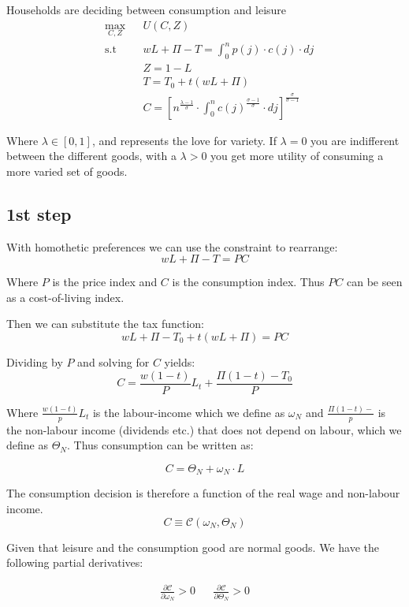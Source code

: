 Households are deciding between consumption and leisure
\begin{equation*}
\begin{aligned}
& \underset{C, Z}{\max}
& & U(C,Z) \\
& \text{s.t}
& & wL + \Pi -T = \int_{0}^{n} p(j) \cdot c(j) \cdot dj \\
& & & Z = 1 - L \\
& & & T = T_0 + t(wL + \Pi) \\
& & & C = \left[ n^{\frac{\lambda - 1}{\sigma}} \cdot \int_{0}^{n} c(j)^{\frac{\sigma - 1}{\sigma}} \cdot dj   \right]^\frac{\sigma}{\sigma - 1}
\end{aligned}
\end{equation*}

Where $\lambda \in \left[0,1 \right]$, and represents the love for variety. If $\lambda = 0$ you are indifferent between the different goods, with a $\lambda > 0$ you get more utility of consuming a more varied set of goods. 

\subsection*{1st step}
With homothetic preferences we can use the constraint to rearrange:
$$
wL + \Pi - T = PC
$$

Where $P$ is the price index and $C$ is the consumption index. Thus $PC$ can be seen as a cost-of-living index. 

Then we can substitute the tax function:
$$
wL + \Pi - T_0 + t(wL + \Pi) = PC
$$

Dividing by $P$ and solving for $C$ yields:
$$
C = \frac{w(1-t)}{P}L_t + \frac{\Pi(1-t)-T_0}{P}
$$

Where $\frac{w(1-t)}{p}L_t$ is the labour-income which we define as $\omega_N$ and $\frac{\Pi(1-t)-}{p}$ is the non-labour income (dividends etc.) that does not depend on labour, which we define as $\Theta_N$. Thus consumption can be written as:

$$
C = \Theta_N + \omega_N \cdot L 
$$


The consumption decision is therefore a function of the real wage and non-labour income. 
$$
C \equiv \mathcal{C}\left(\omega_N, \Theta_N \right)
$$

Given that leisure and the consumption good are normal goods. We have the following partial derivatives:

\begin{align*}
    \frac{\partial \mathcal{C}}{\partial \omega_N} > 0 && \frac{\partial \mathcal{C}}{\partial \Theta_N} > 0
\end{align*}

